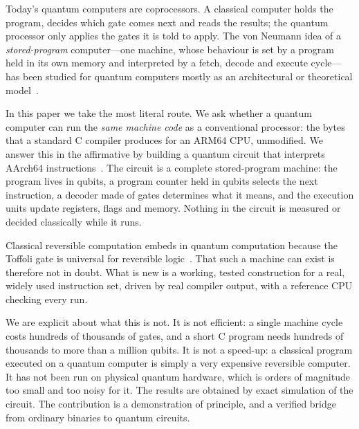 \documentclass[11pt]{article}
\begin{document}
Today's quantum computers are coprocessors. A classical computer holds the program, decides
which gate comes next and reads the results; the quantum processor only applies the gates
it is told to apply. The von Neumann idea of a \emph{stored-program} computer---one machine,
whose behaviour is set by a program held in its own memory and interpreted by a fetch,
decode and execute cycle---has been studied for quantum computers mostly as an architectural
or theoretical model~\cite{mariantoni2011,wang2022prototype,liu2023survey,wang2024family,yuan2024qcm,zhang2025qrm}.

In this paper we take the most literal route. We ask whether a quantum computer can run the
\emph{same machine code} as a conventional processor: the bytes that a standard C compiler
produces for an ARM64 CPU, unmodified. We answer this in the affirmative by building a
quantum circuit that interprets AArch64 instructions~\cite{armarm}. The circuit is a complete
stored-program machine: the program lives in qubits, a program counter held in qubits selects
the next instruction, a decoder made of gates determines what it means, and the execution
units update registers, flags and memory. Nothing in the circuit is measured or decided
classically while it runs.

Classical reversible computation embeds in quantum computation because the Toffoli gate is
universal for reversible logic~\cite{toffoli1980,fredkin1982,nielsen2010}. That such a machine
can exist is therefore not in doubt. What is new is a working, tested construction for a
real, widely used instruction set, driven by real compiler output, with a reference CPU
checking every run.

We are explicit about what this is not. It is not efficient: a single machine cycle costs
hundreds of thousands of gates, and a short C program needs hundreds of thousands to more
than a million qubits. It is not a speed-up: a classical program executed on a quantum
computer is simply a very expensive reversible computer. It has not been run on physical
quantum hardware, which is orders of magnitude too small and too noisy for it. The results
are obtained by exact simulation of the circuit. The contribution is a demonstration of
principle, and a verified bridge from ordinary binaries to quantum circuits.
\end{document}
